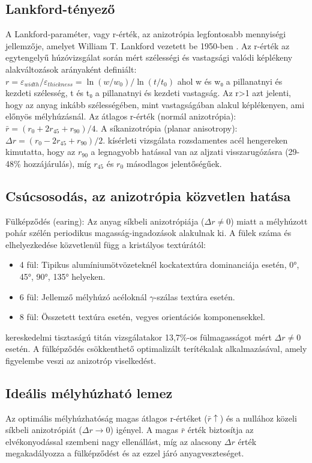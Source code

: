 \documentclass[12pt,a4paper,oneside]{report}
\begin{document}
\subsection{Lankford-tényező}
A Lankford-paraméter, vagy r-érték, az anizotrópia legfontosabb mennyiségi jellemzője, amelyet William T. Lankford vezetett be 1950-ben \cite{Lankford1950}. Az r-érték az egytengelyű húzóvizsgálat során mért szélességi és vastagsági valódi képlékeny alakváltozások arányaként definiált:
$r = \varepsilon_{width} / \varepsilon_{thickness} = \ln(w/w_0) / \ln(t/t_0)$
ahol w és w₀ a pillanatnyi és kezdeti szélesség, t és t₀ a pillanatnyi és kezdeti vastagság. Az r>1 azt jelenti, hogy az anyag inkább szélességében, mint vastagságában alakul képlékenyen, ami előnyös mélyhúzásnál.
Az átlagos r-érték (normál anizotrópia): $\bar{r} = (r_0 + 2r_{45} + r_{90}) / 4$.
A síkanizotrópia (planar anisotropy): $\Delta r = (r_0 - 2r_{45} + r_{90}) / 2$.
\cite{Wu2023} kísérleti vizsgálata rozsdamentes acél hengereken kimutatta, hogy az $r_{90}$ a legnagyobb hatással van az aljzati visszarugózásra (29-48\% hozzájárulás), míg $r_{45}$ és $r_0$ másodlagos jelentőségűek.

\subsection{Csúcsosodás, az anizotrópia közvetlen hatása}
Fülképződés (earing): Az anyag síkbeli anizotrópiája ($\Delta r \neq 0$) miatt a mélyhúzott pohár szélén periodikus magasság-ingadozások alakulnak ki. A fülek száma és elhelyezkedése közvetlenül függ a kristályos textúrától:
\begin{itemize}
    \item 4 fül: Tipikus alumíniumötvözeteknél kockatextúra dominanciája esetén, 0°, 45°, 90°, 135° helyeken.
    \item 6 fül: Jellemző mélyhúzó acéloknál $\gamma$-szálas textúra esetén.
    \item 8 fül: Összetett textúra esetén, vegyes orientációs komponensekkel.
\end{itemize}
\cite{Tang2018} kereskedelmi tisztaságú titán vizsgálatakor 13,7\%-os fülmagasságot mért $\Delta r \neq 0$ esetén. A fülképződés csökkenthető optimalizált terítékalak alkalmazásával, amely figyelembe veszi az anizotróp viselkedést.

\subsection{Ideális mélyhúzható lemez}
Az optimális mélyhúzhatóság magas átlagos r-értéket ($\bar{r} \uparrow$) és a nullához közeli síkbeli anizotrópiát ($\Delta r \to 0$) igényel. A magas $\bar{r}$ érték biztosítja az elvékonyodással szembeni nagy ellenállást, míg az alacsony $\Delta r$ érték megakadályozza a fülképződést és az ezzel járó anyagveszteséget.
\end{document}
